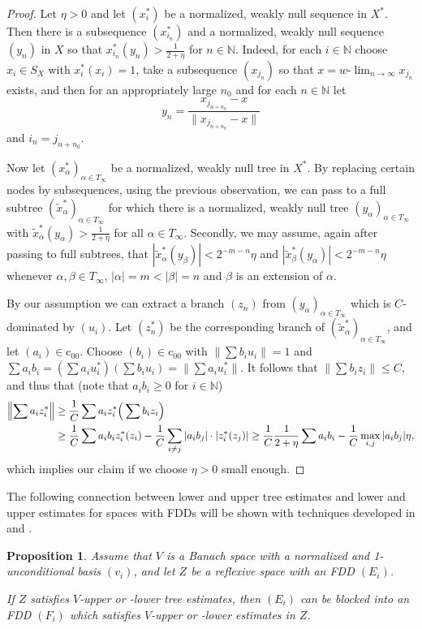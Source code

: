 \documentclass[11pt,leqno]{amsart}
\newtheorem{prop}[thm]{Proposition}
\theoremstyle{definition}
\newcommand{\N}{\mathbb{N}}
\newcommand{\coo}{\mathrm{c}_{00}}
\begin{document}
\begin{proof} Let $\eta>0$
  and let $(x^*_i)$ be a normalized, weakly null sequence in $X^*$.
Then there is a subsequence  $(x^*_{i_n})$  and a normalized, weakly null
 sequence $(y_n)$ in $X$ so that $x^*_{i_n}(y_n)>\frac1{2+\eta}$ for $n\in\N$.
 Indeed, for each $i\in\N$ choose $x_i\in S_X$ with $x^*_i(x_i)=1$, take a subsequence
   $(x_{j_n})$ so that $x=w$-$\lim_{n\to\infty} x_{j_n}$ exists, and
then for an appropriately large $n_0$ and for each $n\in\N$ let
$$y_n= \frac{x_{j_{n+n_0}}-x}{\|x_{j_{n+n_0}}-x\|}$$
and $i_n=j_{n+n_0}$.

Now let $(x^*_\alpha)_{\alpha\in T_\infty}$ be a normalized, weakly null
 tree in $X^*$. By replacing  certain nodes by subsequences,
 using the previous observation,
 we can pass to a full subtree
   $(\tilde x^*_\alpha)_{\alpha\in T_\infty}$    for which
there is a normalized, weakly null tree $(y_\alpha)_{\alpha\in T_\infty}$ with
 $\tilde x^*_\alpha(y_\alpha)>\frac1{2+\eta}$ for all $\alpha\in T_\infty$.
 Secondly, we may assume, again after passing to full  subtrees, that
$|\tilde x^*_\alpha(y_\beta)|<2^{-m-n}\eta$
and  $|\tilde x^*_\beta(y_\alpha)|<2^{-m-n}\eta$
 whenever $\alpha,\beta\in T_\infty$, $|\alpha|=m<|\beta|=n$
  and $\beta$ is an extension of $\alpha$.




By our assumption we can extract  a branch  $ (z_n)$ from
$(y_\alpha)_{\alpha\in T_\infty}$ which is $C$-dominated by $(u_i)$.
Let $ (z_n^*)$ be the corresponding branch of
$(\tilde x^*_\alpha)_{\alpha\in T_\infty}$, and let
$(a_i)\in\coo$. Choose $(b_i)\in \coo$
 with $\|\sum b_i u_i\|=1$ and
$\sum a_i b_i =(\sum a_i u_i^*)(\sum b_i u_i)=\|\sum a_i u_i^*\|$.
It follows that $\|\sum b_i z_i\|\le C$, and thus that (note that $a_ib_i\ge 0$ for $i\in\N$)
\begin{align*}
\Bigl\| \sum a_i z_i^*\Bigr\|&\ge \frac1C
\sum a_i z_i^*\Big( \sum b_i z_i    \Big)\\
&\ge  \frac1C \sum a_i b_iz^*_i(z_i)-\frac1C\sum_{i\not= j}
|a_ib_j|\cdot|z^*_i(z_j)|
 \ge
\frac1C \frac1{2+\eta}\sum a_ib_i - \frac1C\max_{i,j} |a_ib_j|\eta,
\end{align*}
which implies our claim if we choose $\eta>0$ small enough.
\end{proof}

The following connection between lower and upper tree
estimates and lower and upper estimates for spaces with FDDs
will be shown with techniques  developed in  \cite{OS1} and \cite{KOS}.
\begin{prop}\label{P:1.5}
  Assume that $V$ is a Banach space with a normalized  and
  1-unconditional basis $(v_i)$, and let $Z$ be a reflexive space with
  an FDD $(E_i)$.

  If $Z$ satisfies $V$-upper or -lower tree estimates, then $(E_i)$
  can be blocked into an FDD $(F_i)$ which satisfies   $V$-upper or
  -lower   estimates in $Z$.
\end{prop}
\end{document}

